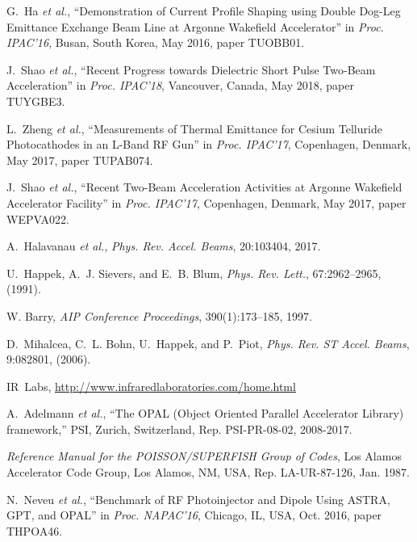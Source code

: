 \documentclass[letterpaper,  %
              ]{jacow-2_3}   %
\begin{document}
\begin{thebibliography}{99}
G.~Ha \emph{et al.}, “Demonstration of Current Profile 
Shaping using Double Dog-Leg Emittance Exchange Beam 
Line at Argonne Wakefield Accelerator”
in \textit{Proc. IPAC’16}, 
Busan, South Korea, May 2016, 
paper TUOBB01.

J.~Shao \emph{et al.}, 
“Recent Progress towards Dielectric Short Pulse Two-Beam Acceleration”
in \textit{Proc. IPAC’18}, 
Vancouver, Canada, May 2018, 
paper TUYGBE3.

L.~Zheng \emph{et al.}, “Measurements of Thermal Emittance 
for Cesium Telluride Photocathodes in an L-Band RF Gun”
in \textit{Proc. IPAC’17}, 
Copenhagen, Denmark, May 2017, 
paper TUPAB074.

J.~Shao \emph{et al.}, “Recent Two-Beam 
Acceleration Activities at Argonne Wakefield Accelerator Facility”
in \textit{Proc. IPAC’17}, 
Copenhagen, Denmark, May 2017, 
paper WEPVA022.

A.~Halavanau \textit{et al.},
\emph{Phys. Rev. Accel. Beams}, 20:103404, 2017.

U.~Happek, A.~J. Sievers, and E.~B. Blum,
\emph{Phys. Rev. Lett.}, 67:2962--2965, (1991).

W. Barry,
\emph{AIP Conference Proceedings}, 390(1):173--185, 1997.

D.~Mihalcea, C.~L. Bohn, U.~Happek, and P.~Piot,
\newblock \emph{Phys. Rev. ST Accel. Beams}, 9:082801, (2006).

IR~Labs,
\newblock \url{http://www.infraredlaboratories.com/home.html}

A.~Adelmann \emph{et al.},
“The OPAL (Object Oriented Parallel Accelerator Library) framework,”
PSI, Zurich, Switzerland,
Rep. PSI-PR-08-02, 2008-2017.

\emph{Reference Manual for the POISSON/SUPERFISH Group of 
	Codes},  Los Alamos Accelerator Code Group,  
Los Alamos, NM, USA, 
Rep. LA-UR-87-126, Jan. 1987.

N.~Neveu \emph{et al.}, 
“Benchmark of RF Photoinjector and Dipole
Using ASTRA, GPT, and OPAL”
in \textit{Proc. NAPAC’16}, 
Chicago, IL, USA, Oct. 2016, 
paper THPOA46.




\end{thebibliography}



\null  %
\end{document}
